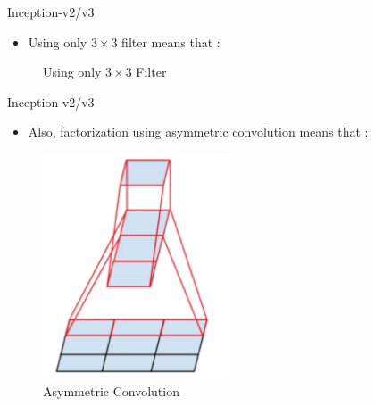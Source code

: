 \documentclass{beamer}
\begin{document}
\begin{frame}{Inception-v2/v3}
	\begin{itemize}
		\item Using only $3 \times 3$ filter means that :
	\end{itemize}
	\vspace{7pt}
	\begin{figure}[h]		
		\centering
		\quad
		\caption{Using only $3 \times 3$ Filter}
		\label{orifactor}
	\end{figure}
\end{frame}


\begin{frame}{Inception-v2/v3}
	\begin{itemize}
		\item Also, factorization using asymmetric convolution means that :
	\end{itemize}
	\vspace{7pt}
	\begin{figure}[h]		
		\centering
		\includegraphics[scale=0.75]{./v2_v3/asym_conv.PNG}
		\caption{Asymmetric Convolution}
		\label{asymconv}
	\end{figure}
\end{frame}
\end{document}
